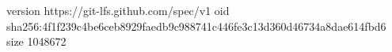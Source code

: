 version https://git-lfs.github.com/spec/v1
oid sha256:4f1f239c4be6ceb8929faedb9c988741c446fe3c13d360d46734a8dae614fbd6
size 1048672
